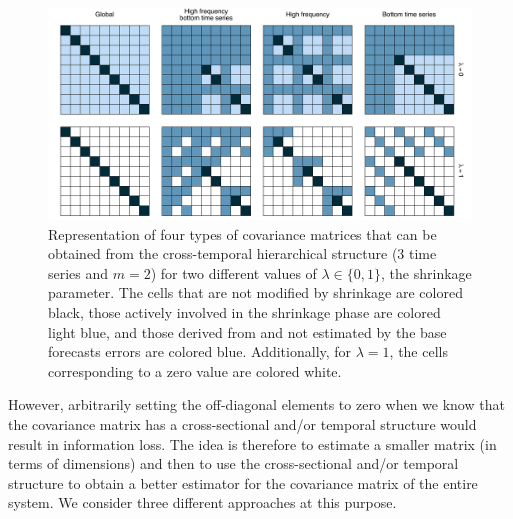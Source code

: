 \documentclass[a4paper,11pt]{article}
\theoremstyle{definition}
\begin{document}
\begin{figure}[!h]
	\centering
	\includegraphics[width = \linewidth]{fig/shr_cov/shr_color.pdf}
	\caption{Representation of four types of covariance matrices that can be obtained from the cross-temporal hierarchical structure ($3$ time series and $m = 2$) for two different values of $\lambda\in\{0,1\}$, the shrinkage parameter. The cells that are not modified by shrinkage are colored black, those actively involved in the shrinkage phase are colored light blue, and those derived from and not estimated by the base forecasts errors are colored blue. Additionally, for $\lambda = 1$, the cells corresponding to a zero value are colored white.}
	\label{fig:shr_grid}
	\end{figure}

However, arbitrarily setting the off-diagonal elements to zero when we know that the covariance matrix has a cross-sectional and/or temporal structure would result in information loss. The idea is therefore to estimate a smaller matrix (in terms of dimensions) and then to use the cross-sectional and/or temporal structure to obtain a better estimator for the covariance matrix of the entire system. We consider three different approaches at this purpose.
\end{document}
